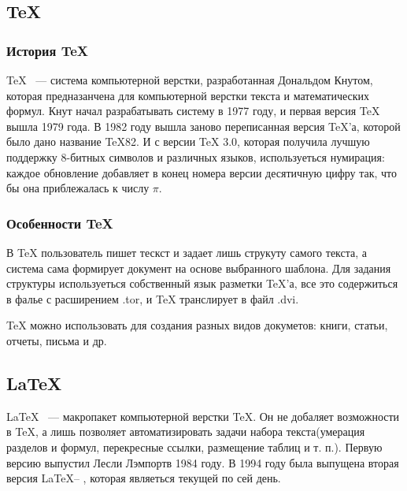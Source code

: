 \documentclass[14pt,a4paper]{article}
\begin{document}
\subsection{\TeX}
\subsubsection{История \TeX}
\TeX{} ~--- система компьютерной верстки, разработанная Дональдом Кнутом, которая
предназанчена для компьютерной верстки текста и математических формул. Кнут
начал разрабатывать систему в 1977 году, и первая версия \TeX{} вышла 1979
года. В 1982 году вышла заново переписанная версия \TeX'а, которой было дано
название TeX82. И с версии \TeX{} 3.0, которая получила лучшую поддержку
8-битных символов и различных языков, используеться нумирация: каждое обновление
добавляет в конец номера версии десятичную цифру так, что бы она приблежалась к
числу \begin{math} \pi \end{math}.

\subsubsection{Особенности \TeX}
В \TeX{} пользователь пишет тескст и задает лишь струкуту самого текста, а система
сама формирует документ на основе выбранного шаблона. Для задания структуры
используеться собственный язык разметки \TeX'а, все это содержиться в фалье с
расширением .tor, и \TeX{} транслирует в файл .dvi.

\TeX{} можно использовать для создания разных видов докуметов: книги, статьи,
отчеты, письма и др.

\subsection{\LaTeX}
\LaTeX{} ~--- макропакет компьютерной верстки \TeX{}. Он не добаляет возможности
в \TeX{}, а лишь позволяет автоматизировать задачи набора текста(умерация
разделов и формул, перекресные ссылки, размещение таблиц и т. п.). Первую версию
выпустил Лесли Лэмпортв 1984 году. В 1994 году была выпущена вторая версия
\LaTeX -- \LaTeXe{}, которая являеться текущей по сей день.
\end{document}
